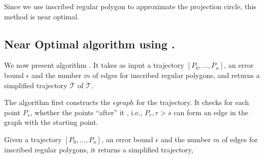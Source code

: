 Since we use inscribed regular polygon to approximate the projection circle,
this method is near optimal.

\subsection{Near Optimal algorithm using \sed.}


We now present algorithm \cisto. It takes as input a trajectory ${[P_0, \ldots, P_n]}$, an error bound $\epsilon$ and the number $m$ of edges for inscribed regular polygons, and returns a simplified  trajectory $\overline{\mathcal{T}}$ of $\dddot{\mathcal{T}}$.

The algorithm first  constructs the $\epsilon graph$ for the trajectory. It
checks for each point $P_s$, whether the points ``after'' it , i.e., $P_r,r > s$
can form an edge in the graph with the starting point. 

Given a trajectory ${[P_0, \ldots, P_n]}$, an error bound $\epsilon$ and the number $m$ of edges for inscribed
regular polygons, it returns a simplified trajectory,


